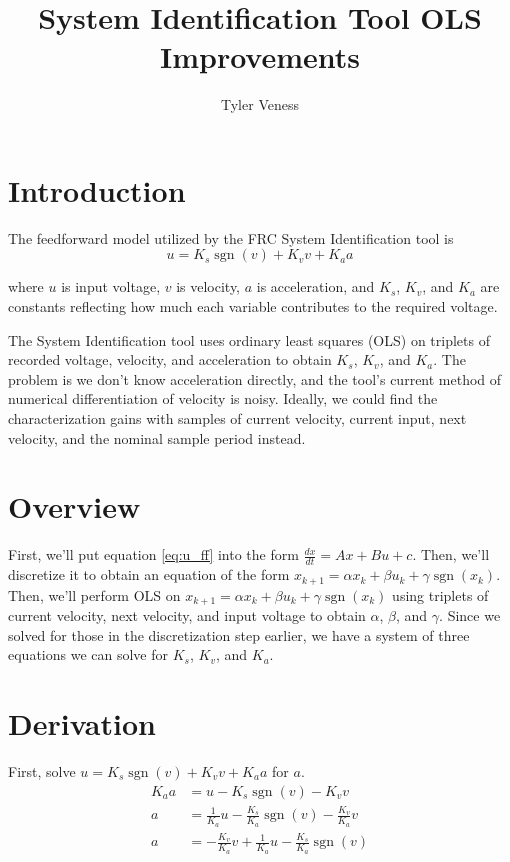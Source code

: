 \documentclass[10pt,conference,compsoc]{IEEEtran}
\DeclareMathOperator{\sgn}{sgn}
\begin{document}
\title{System Identification Tool OLS Improvements}
\author{Tyler Veness}
\maketitle

\section{Introduction}

The feedforward model utilized by the FRC System Identification tool is
\begin{equation}
  u = K_s\sgn(v) + K_v v + K_a a \label{eq:u_ff}
\end{equation}

where $u$ is input voltage, $v$ is velocity, $a$ is acceleration, and $K_s$,
$K_v$, and $K_a$ are constants reflecting how much each variable contributes to
the required voltage.

The System Identification tool uses ordinary least squares (OLS) on triplets of
recorded voltage, velocity, and acceleration to obtain $K_s$, $K_v$, and $K_a$.
The problem is we don't know acceleration directly, and the tool's current
method of numerical differentiation of velocity is noisy. Ideally, we could find
the characterization gains with samples of current velocity, current input, next
velocity, and the nominal sample period instead.

\section{Overview}

First, we'll put equation \eqref{eq:u_ff} into the form
$\frac{dx}{dt} = Ax + Bu + c$. Then, we'll discretize it to obtain an equation
of the form $x_{k+1} = \alpha x_k + \beta u_k + \gamma\sgn(x_k)$. Then, we'll
perform OLS on $x_{k+1} = \alpha x_k + \beta u_k + \gamma\sgn(x_k)$ using
triplets of current velocity, next velocity, and input voltage to obtain
$\alpha$, $\beta$, and $\gamma$. Since we solved for those in the discretization
step earlier, we have a system of three equations we can solve for $K_s$, $K_v$,
and $K_a$.

\section{Derivation}

First, solve $u = K_s\sgn(v) + K_v v + K_a a$ for $a$.
\begin{align*}
  K_a a &= u - K_s\sgn(v) - K_v v \\
  a &= \frac{1}{K_a} u - \frac{K_s}{K_a}\sgn(v) - \frac{K_v}{K_a} v \\
  a &= -\frac{K_v}{K_a} v + \frac{1}{K_a} u - \frac{K_s}{K_a}\sgn(v)
\end{align*}
\end{document}
